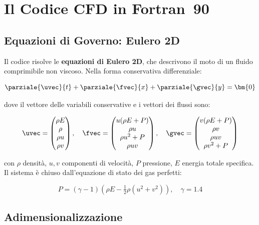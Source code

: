 \section{Il Codice CFD in Fortran~90}
\label{sec:codice_cfd}

\subsection{Equazioni di Governo: Eulero 2D}

Il codice risolve le \textbf{equazioni di Eulero 2D}, che descrivono il moto di un fluido
comprimibile non viscoso. Nella forma conservativa differenziale:

\begin{equation}
  \parziale{\uvec}{t}
  + \parziale{\fvec}{x}
  + \parziale{\gvec}{y} = \bm{0}
  \label{eq:eulero_diff}
\end{equation}

dove il vettore delle variabili conservative e i vettori dei flussi sono:

\begin{equation}
  \uvec = \begin{pmatrix} \rho E \\ \rho \\ \rho u \\ \rho v \end{pmatrix}, \quad
  \fvec = \begin{pmatrix} u(\rho E + P) \\ \rho u \\ \rho u^2 + P \\ \rho u v \end{pmatrix}, \quad
  \gvec = \begin{pmatrix} v(\rho E + P) \\ \rho v \\ \rho u v \\ \rho v^2 + P \end{pmatrix}
\end{equation}

con $\rho$ densità, $u, v$ componenti di velocità, $P$ pressione, $E$ energia totale specifica.
Il sistema è chiuso dall'equazione di stato dei gas perfetti:

\begin{equation}
  P = (\gamma - 1)\left(\rho E - \tfrac{1}{2}\rho(u^2+v^2)\right), \quad \gamma = 1.4
\end{equation}

\subsection{Adimensionalizzazione}

